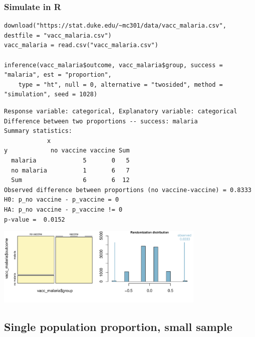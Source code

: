 \documentclass[slidestop,compress,mathserif,12pt,t,professionalfonts,xcolor=table]{beamer}
\begin{document}
\begin{frame}[fragile]
\frametitle{Simulate in R}

\vspace{-0.25cm}

{\tiny
\begin{Verbatim}[frame=single, formatcom=\color{blue}]
download("https://stat.duke.edu/~mc301/data/vacc_malaria.csv", destfile = "vacc_malaria.csv")
vacc_malaria = read.csv("vacc_malaria.csv")

inference(vacc_malaria$outcome, vacc_malaria$group, success = "malaria", est = "proportion", 
    type = "ht", null = 0, alternative = "twosided", method = "simulation", seed = 1028)
\end{Verbatim}
}

\pause

{\tiny
\begin{Verbatim}[frame=single, formatcom=\color{gray}]
Response variable: categorical, Explanatory variable: categorical
Difference between two proportions -- success: malaria
Summary statistics:
            x
y            no vaccine vaccine Sum
  malaria             5       0   5
  no malaria          1       6   7
  Sum                 6       6  12
Observed difference between proportions (no vaccine-vaccine) = 0.8333
H0: p_no vaccine - p_vaccine = 0 
HA: p_no vaccine - p_vaccine != 0 
p-value =  0.0152 
\end{Verbatim}
}

\includegraphics[width=0.75\textwidth]{figures/malaria/malaria}

\end{frame}


\subsection{Single population proportion, small sample}


\begin{frame}

\vfill


\vfill

\end{frame}
\end{document}

